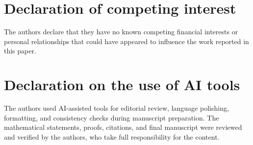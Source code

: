 \documentclass[12pt,reqno]{amsart}
\theoremstyle{definition}
\theoremstyle{remark}
\begin{document}
\nocite{MaZhang2026ConditionalGluingFailure}

\section*{Declaration of competing interest}
The authors declare that they have no known competing financial interests or
personal relationships that could have appeared to influence the work reported
in this paper.

\section*{Declaration on the use of AI tools}
The authors used AI-assisted tools for editorial review, language polishing,
formatting, and consistency checks during manuscript preparation. The
mathematical statements, proofs, citations, and final manuscript were reviewed
and verified by the authors, who take full responsibility for the content.



\end{document}
